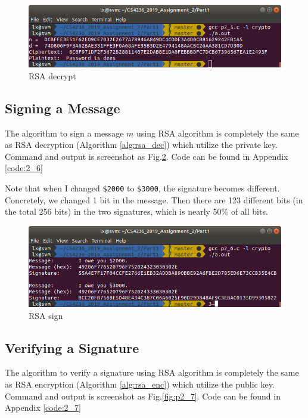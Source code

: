 \begin{figure}[ht]
\centering
\includegraphics[width=\columnwidth]{pictures/p2_5.png}
\caption{
    RSA decrypt
}
\label{fig:p2_5}
\end{figure}

\subsection{Signing a Message}
\label{subs:sign}

The algorithm to sign a message $m$ using RSA algorithm is completely the same as RSA decryption (Algorithm \ref{alg:rsa_dec}) which utilize the private key.
Command and output is screenshot as Fig.\ref{fig:p2_6}.
Code can be found in Appendix \ref{code:2_6}

Note that when I changed \texttt{\$2000} to \texttt{\$3000}, the signature becomes different. Concretely, we changed 1 bit in the message. Then there are 123 different bits (in the total 256 bits) in the two signatures, which is nearly 50\% of all bits.

\begin{figure}[ht]
\centering
\includegraphics[width=\columnwidth]{pictures/p2_6.png}
\caption{
    RSA sign
}
\label{fig:p2_6}
\end{figure}

\subsection{Verifying a Signature}

The algorithm to verify a signature using RSA algorithm is completely the same as RSA encryption (Algorithm \ref{alg:rsa_enc}) which utilize the public key.
Command and output is screenshot as Fig.\ref{fig:p2_7}.
Code can be found in Appendix \ref{code:2_7}

